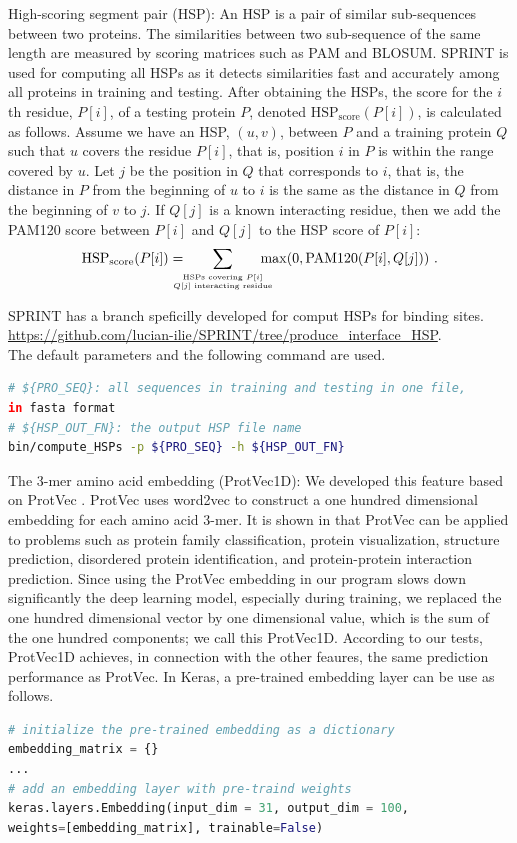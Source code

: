 High-scoring segment pair (HSP): An HSP is a pair of similar sub-sequences between two proteins. The similarities between two sub-sequence of the same length are measured by scoring matrices such as PAM and BLOSUM. SPRINT \cite{li2017sprint} is used for computing all HSPs as it detects similarities fast and accurately among all proteins in training and testing. After obtaining the HSPs, the score for the $i$th residue, $P[i]$, of a testing protein $P$, denoted $\text{HSP}_{\text{score}}(P[i])$, is calculated as follows. Assume we have an HSP, $(u,v)$, between $P$ and a training protein $Q$ such that $u$ covers the residue $P[i]$, that is, position $i$ in $P$ is within the range covered by $u$. Let $j$ be the position in $Q$ that corresponds to $i$, that is, the distance in $P$ from the beginning of $u$ to $i$ is the same as the distance in $Q$ from the beginning of $v$ to $j$. If $Q[j]$ is a known interacting residue, then we add the PAM120 score between $P[i]$ and $Q[j]$ to the HSP score of $P[i]$:
\[
\text{HSP}_{\text{score}}(P[i]) = \!\!\!\!\!\!\sum_{\stackrel{\text{\tiny HSPs covering $P[i]$}}{\text{\tiny $Q[j]$ interacting residue}}}\!\!\!\!\!\! \max(0, \text{PAM120}(P[i], Q[j])) \ .
\]

SPRINT has a branch speficilly developed for comput HSPs for binding sites.\\ \href{https://github.com/lucian-ilie/SPRINT/tree/produce_interface_HSP}{https://github.com/lucian-ilie/SPRINT/tree/produce\_interface\_HSP}.\\ The default parameters and the following command are used.
\begin{lstlisting}[language=bash,frame=single]
# ${PRO_SEQ}: all sequences in training and testing in one file, 
in fasta format
# ${HSP_OUT_FN}: the output HSP file name
bin/compute_HSPs -p ${PRO_SEQ} -h ${HSP_OUT_FN} 
\end{lstlisting}

The 3-mer amino acid embedding (ProtVec1D): We developed this feature based on ProtVec \cite{asgari2015continuous}. ProtVec uses word2vec \cite{mikolov2013distributed} to construct a one hundred dimensional embedding for each amino acid 3-mer. It is shown in \cite{asgari2015continuous} that ProtVec can be applied to problems such as protein family classification, protein visualization, structure prediction, disordered protein identification, and protein-protein interaction prediction. Since using the ProtVec embedding in our program slows down significantly the deep learning model, especially during training, we replaced the one hundred dimensional vector by one dimensional value, which is the sum of the one hundred components; we call this ProtVec1D. According to our tests, ProtVec1D achieves, in connection with the other feaures, the same prediction performance as ProtVec. In Keras, a pre-trained embedding layer can be use as follows.
\begin{lstlisting}[language=python,frame=single]
# initialize the pre-trained embedding as a dictionary
embedding_matrix = {}
...
# add an embedding layer with pre-traind weights
keras.layers.Embedding(input_dim = 31, output_dim = 100,
weights=[embedding_matrix], trainable=False)
\end{lstlisting}

